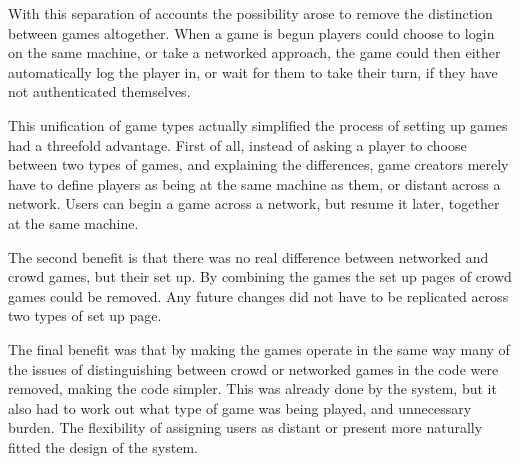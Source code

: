 With this separation of accounts the possibility arose to remove the distinction between games altogether. When a game is begun players could choose to login on the same machine, or take a networked approach, the game could then either automatically log the player in, or wait for them to take their turn, if they have not authenticated themselves.

This unification of game types actually simplified the process of setting up games had a threefold advantage. First of all, instead of asking a player to choose between two types of games, and explaining the differences, game creators merely have to define players as being at the same machine as them, or distant across a network. Users can begin a game across a network, but resume it later, together at the same machine. 

The second benefit is that there was no real difference between networked and crowd games, but their set up. By combining the games the set up pages of crowd games could be removed. Any future changes did not have to be replicated across two types of set up page.

The final benefit was that by making the games operate in the same way many of the issues of distinguishing between crowd or networked games in the code were removed, making the code simpler. This was already done by the system, but it also had to work out what type of game was being played, and unnecessary burden. The flexibility of assigning users as distant or present more naturally fitted the design of the system.